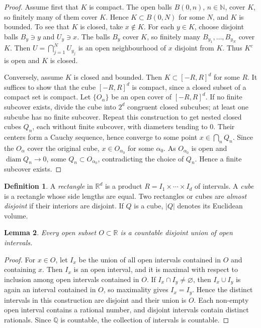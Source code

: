 \documentclass[11pt,openany]{book}
\numberwithin{equation}{chapter}
\theoremstyle{definition}
\newtheorem{definition}{Definition}[chapter]
\theoremstyle{plain}
\newtheorem{lemma}[definition]{Lemma}
\theoremstyle{remark}
\newcommand{\R}{\mathbb{R}}
\newcommand{\N}{\mathbb{N}}
\newcommand{\Q}{\mathbb{Q}}
\newcommand{\1}{\mathbf{1}}
\newcommand{\abs}[1]{\left\lvert #1\right\rvert}
\newcommand{\diam}{\operatorname{diam}}
\begin{document}
\begin{proof}
Assume first that \(K\) is compact.  The open balls \(B(0,n)\), \(n\in\N\), cover \(K\), so finitely many of them cover \(K\).  Hence \(K\subset B(0,N)\) for some \(N\), and \(K\) is bounded.  To see that \(K\) is closed, take \(x\notin K\).  For each \(y\in K\), choose disjoint balls \(B_y\ni y\) and \(U_y\ni x\).  The balls \(B_y\) cover \(K\), so finitely many \(B_{y_1},\ldots,B_{y_N}\) cover \(K\).  Then \(U=\bigcap_{j=1}^N U_{y_j}\) is an open neighbourhood of \(x\) disjoint from \(K\).  Thus \(K^c\) is open and \(K\) is closed.

Conversely, assume \(K\) is closed and bounded.  Then \(K\subset [-R,R]^d\) for some \(R\).  It suffices to show that the cube \([-R,R]^d\) is compact, since a closed subset of a compact set is compact.  Let \(\{O_\alpha\}\) be an open cover of \([-R,R]^d\).  If no finite subcover exists, divide the cube into \(2^d\) congruent closed subcubes; at least one subcube has no finite subcover.  Repeat this construction to get nested closed cubes \(Q_n\), each without finite subcover, with diameters tending to \(0\).  Their centers form a Cauchy sequence, hence converge to some point \(x\in \bigcap_n Q_n\).  Since the \(O_\alpha\) cover the original cube, \(x\in O_{\alpha_0}\) for some \(\alpha_0\).  As \(O_{\alpha_0}\) is open and \(\diam Q_n\to 0\), some \(Q_n\subset O_{\alpha_0}\), contradicting the choice of \(Q_n\).  Hence a finite subcover exists.
\end{proof}

\begin{definition}
A \emph{rectangle} in \(\R^d\) is a product \(R=I_1\times\cdots\times I_d\) of intervals.  A \emph{cube} is a rectangle whose side lengths are equal.  Two rectangles or cubes are \emph{almost disjoint} if their interiors are disjoint.  If \(Q\) is a cube, \(\abs{Q}\) denotes its Euclidean volume.
\end{definition}

\begin{lemma}
Every open subset \(O\subset\R\) is a countable disjoint union of open intervals.
\end{lemma}

\begin{proof}
For \(x\in O\), let \(I_x\) be the union of all open intervals contained in \(O\) and containing \(x\).  Then \(I_x\) is an open interval, and it is maximal with respect to inclusion among open intervals contained in \(O\).  If \(I_x\cap I_y\ne\varnothing\), then \(I_x\cup I_y\) is again an interval contained in \(O\), so maximality gives \(I_x=I_y\).  Hence the distinct intervals in this construction are disjoint and their union is \(O\).  Each non-empty open interval contains a rational number, and disjoint intervals contain distinct rationals.  Since \(\Q\) is countable, the collection of intervals is countable.
\end{proof}
\end{document}
